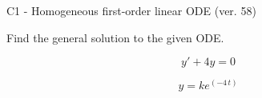 \begin{exercise}
  \begin{exerciseTitle}C1 - Homogeneous first-order linear ODE (ver. 58)\end{exerciseTitle}
  \begin{exerciseStatement}
    
Find the general solution to the given ODE.

    
\[y'+4y=0\]

  \end{exerciseStatement}
  \begin{exerciseAnswer}
    
\[y= k e^{\left(-4 \, t\right)}\]

  \end{exerciseAnswer}
\end{exercise}
